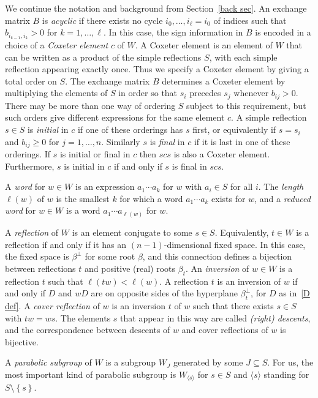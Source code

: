 \documentclass[ALCO,ThmDefs,Unicode,epreuves]{cedram}
\newcommand{\newword}[1]{\emph{#1}}
\newcommand{\set}[1]{{\left\lbrace #1 \right\rbrace}}
\newcommand{\br}[1]{{\langle #1 \rangle}}
\begin{document}
We continue the notation and background from Section~\ref{back sec}.
An exchange matrix $B$ is \newword{acyclic} if there exists no cycle $i_0,\ldots,i_\ell=i_0$ of indices such that $b_{i_{k-1},i_k}>0$ for $k=1,\ldots,\ell$.
In this case, the sign information in $B$ is encoded in a choice of a \newword{Coxeter element} $c$ of $W$.
A Coxeter element is an element of $W$ that can be written as a product of the simple reflections $S$, with each simple reflection appearing exactly once.
Thus we specify a Coxeter element by giving a total order on $S$.
The exchange matrix $B$ determines a Coxeter element by multiplying the elements of $S$ in order so that $s_i$ precedes $s_j$ whenever $b_{ij}>0$.
There may be more than one way of ordering $S$ subject to this requirement, but such orders give different expressions for the same element $c$.
A simple reflection $s\in S$ is \newword{initial} in $c$ if one of these orderings has $s$ first, or equivalently if $s=s_i$ and $b_{ij}\ge0$ for $j=1,\ldots,n$.
Similarly $s$ is \newword{final} in $c$ if it is last in one of these orderings.
If $s$ is initial or final in $c$ then $scs$ is also a Coxeter element.
Furthermore, $s$ is initial in $c$ if and only if $s$ is final in $scs$.

A \newword{word} for $w\in W$ is an expression $a_1\cdots a_k$ for $w$ with $a_i\in S$ for all $i$.
The \newword{length} $\ell(w)$ of $w$ is the smallest $k$ for which a word $a_1\cdots a_k$ exists for $w$, and a \newword{reduced word} for $w\in W$ is a word $a_1\cdots a_{\ell(w)}$ for $w$.

A \newword{reflection} of $W$ is an element conjugate to some $s\in S$.
Equivalently, $t\in W$ is a reflection if and only if it has an $(n-1)$-dimensional fixed space.
In this case, the fixed space is $\beta^\perp$ for some root $\beta$, and this connection defines a bijection between reflections $t$ and positive (real) roots $\beta_t$.
An \newword{inversion} of $w\in W$ is a reflection $t$ such that $\ell(tw)<\ell(w)$.
A reflection $t$ is an inversion of $w$ if and only if $D$ and $wD$ are on opposite sides of the hyperplane $\beta_t^\perp$, for $D$ as in~\eqref{D def}.
A \newword{cover reflection} of $w$ is an inversion $t$ of $w$ such that there exists $s\in S$ with $tw=ws$.
The elements $s$ that appear in this way are called \newword{(right) descents}, and the correspondence between descents of $w$ and cover reflections of $w$ is bijective.

A \newword{parabolic subgroup} of $W$ is a subgroup $W_J$ generated by some $J\subseteq S$.
For us, the most important kind of parabolic subgroup is $W_\br{s}$ for $s\in S$ and $\br{s}$ standing for $S\setminus\set{s}$.
\end{document}
